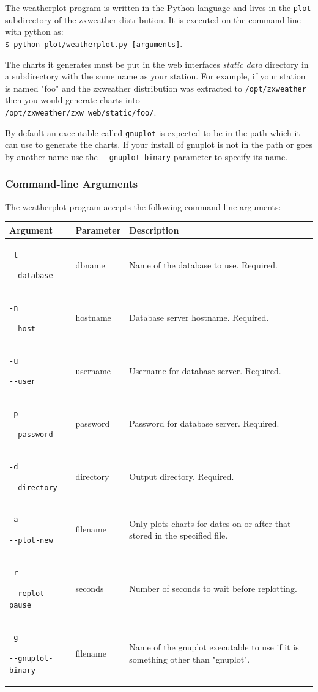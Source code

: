 \documentclass[a4paper,10pt,draft]{book}
\begin{document}
The weatherplot program is written in the Python language and lives in the \verb|plot| subdirectory of the zxweather distribution. It is executed on the command-line with python as: \\ \verb|$ python plot/weatherplot.py [arguments]|.

The charts it generates must be put in the web interfaces \emph{static data} directory in a subdirectory with the same name as your station. For example, if your station is named "foo" and the zxweather distribution was extracted to \verb|/opt/zxweather| then you would generate charts into \\ \verb|/opt/zxweather/zxw_web/static/foo/|.

By default an executable called \verb|gnuplot| is expected to be in the path which it can use to generate the charts. If your install of gnuplot is not in the path or goes by another name use the \verb|--gnuplot-binary| parameter to specify its name.

\subsubsection{Command-line Arguments}
The weatherplot program accepts the following command-line arguments:

\begin{tabular}{p{3.4cm} l p{8cm}}
\hline
\textbf{Argument} & \textbf{Parameter} & \textbf{Description} \\
\hline
\verb|-t| \par \verb|--database| & dbname & Name of the database to use. Required. \\
\verb|-n| \par \verb|--host| & hostname & Database server hostname. Required. \\
\verb|-u| \par \verb|--user| & username & Username for database server. Required. \\
\verb|-p| \par \verb|--password| & password & Password for database server. Required. \\
\verb|-d| \par \verb|--directory| & directory & Output directory. Required. \\
\verb|-a| \par \verb|--plot-new| & filename & Only plots charts for dates on or after that stored in the specified file. \\
\verb|-r| \par \verb|--replot-pause| & seconds & Number of seconds to wait before replotting.\\
\verb|-g| \par \verb|--gnuplot-binary| & filename & Name of the gnuplot executable to use if it is something other than "gnuplot".\\
\hline
\end{tabular}
\end{document}
